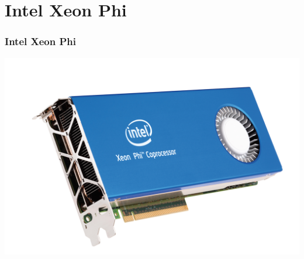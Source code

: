 \documentclass[10pt, compress]{beamer}
\begin{document}

\section{Intel Xeon Phi}

\begin{frame}
    \frametitle{Intel Xeon Phi}
    \begin{center}
        \includegraphics[width=\textwidth]{xeonphi}
    \end{center}
\end{frame}
\end{document}
